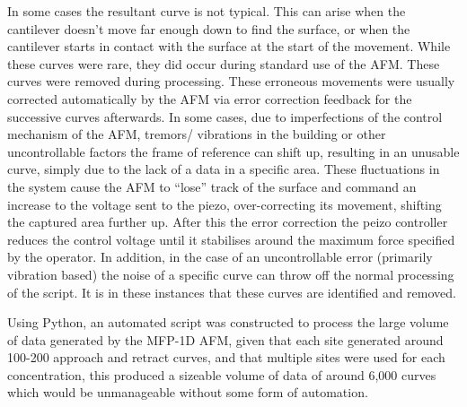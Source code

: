 In some cases the resultant curve is not typical. This can arise when the cantilever doesn't move far enough down to find the surface, or when the cantilever starts in contact with the surface at the start of the movement. While these curves were rare, they did occur during standard use of the AFM. These curves were removed during processing. These erroneous movements were usually corrected automatically by the AFM via error correction feedback for the successive curves afterwards. In some cases, due to imperfections of the control mechanism of the AFM, tremors/ vibrations in the building or other uncontrollable factors the frame of reference can shift up, resulting in an unusable curve, simply due to the lack of a data in a specific area. These fluctuations in the system cause the AFM to ``lose'' track of the surface and command an increase to the voltage sent to the piezo, over-correcting its movement, shifting the captured area further up. After this the error correction the peizo controller reduces the control voltage until it stabilises around the maximum force specified by the operator. In addition, in the case of an uncontrollable error (primarily vibration based) the noise of a specific curve can throw off the normal processing of the script. It is in these instances that these curves are identified and removed.

Using Python\cite{python}, an automated script was constructed to process the large volume of data generated by the MFP-1D AFM, given that each site generated around 100-200 approach and retract curves, and that multiple sites were used for each concentration, this produced a sizeable volume of data of around 6,000 curves which would be unmanageable without some form of automation.









